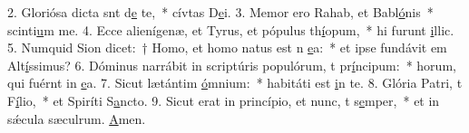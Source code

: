 2. Gloriósa dicta snt d\uline{e} te,~* cívtas D\uline{e}i.
3. Memor ero Rahab, et Babl\uline{ó}nis~* scinti\uline{u}m me.
4. Ecce alienígenæ, et Tyrus, et pópulus th\uline{í}opum,~* hi furunt \uline{i}llic.
5. Numquid Sion dicet:~† Homo, et homo natus est n \uline{e}a:~* et ipse fundávit em Alt\uline{í}ssimus?
6. Dóminus narrábit in scriptúris populórum, t pr\uline{í}ncipum:~* horum, qui fuérnt in \uline{e}a.
7. Sicut lætántim \uline{ó}mnium:~* habitáti est \uline{i}n te.
8. Glória Patri, t F\uline{í}lio,~* et Spiríti S\uline{a}ncto.
9. Sicut erat in princípio, et nunc, t s\uline{e}mper,~* et in sǽcula sæculrum. \uline{A}men.
